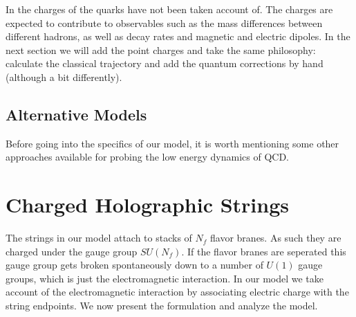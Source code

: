 \documentclass[11pt,a4paper]{article}
\begin{document}
In \cite{Sonnenschein14} the charges of the quarks have not been taken account of. The charges are expected to contribute to observables such as the mass differences between different hadrons, as well as decay rates and magnetic and electric dipoles. In the next section we will add the point charges and take the same philosophy: calculate the classical trajectory and add the quantum corrections by hand (although a bit differently).

\subsection{Alternative Models}

Before going into the specifics of our model, it is worth mentioning some other approaches available for probing the low energy dynamics of QCD. 


\FloatBarrier
\section{Charged Holographic Strings}

The strings in our model attach to stacks of $N_f$ flavor branes. As such they are charged under the gauge group $SU(N_f)$. If the flavor branes are seperated this gauge group gets broken spontaneously down to a number of $U(1)$ gauge groups, which is just the electromagnetic interaction. In our model we take account of the electromagnetic interaction by associating electric charge with the string endpoints. We now present the formulation and analyze the model.
\end{document}
